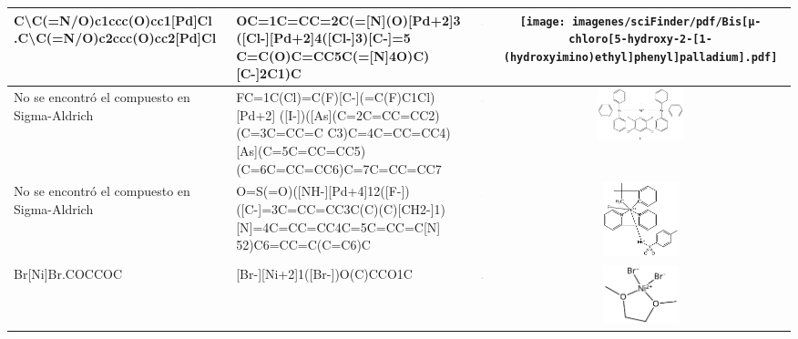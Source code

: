 \begin{landscape}
\begin{longtable}{m{7cm}m{8cm}cc}
 C\textbackslash C(=N/O)c1ccc(O)cc1[Pd]Cl .C\textbackslash C(=N/O)c2ccc(O)cc2[Pd]Cl & 
 OC=1C=CC=2C(=[N](O)[Pd+2]3 ([Cl-][Pd+2]4([Cl-]3)[C-]=5 C=C(O)C=CC5C(=[N]4O)C)[C-]2C1)C & 
 \includegraphics[width=2.2cm]{imagenes/placeholder.png} & 
 \texttt{[image: imagenes/sciFinder/pdf/Bis[µ-chloro[5-hydroxy-2-[1-(hydroxyimino)ethyl]phenyl]palladium].pdf]} \\
\hline


 No se encontró el compuesto en Sigma-Aldrich & 
 FC=1C(Cl)=C(F)[C-](=C(F)C1Cl)[Pd+2] ([I-])([As](C=2C=CC=CC2)(C=3C=CC=C C3)C=4C=CC=CC4)[As](C=5C=CC=CC5) (C=6C=CC=CC6)C=7C=CC=CC7 & 
 \includegraphics[width=2.2cm]{imagenes/placeholder.png} & 
 \includegraphics[width=2.5cm]{imagenes/sciFinder/pdf/(SP-4-3)-(3,5-Dichloro-2,4,6-trifluorophenyl)iodobis(triphenylarsine)palladium.pdf} \\
\hline


 No se encontró el compuesto en Sigma-Aldrich & 
 O=S(=O)([NH-][Pd+4]12([F-])([C-]=3C=CC=CC3C(C)(C)[CH2-]1) [N]=4C=CC=CC4C=5C=CC=C[N] 52)C6=CC=C(C=C6)C & 
 \includegraphics[width=2.2cm]{imagenes/placeholder.png} & 
 \includegraphics[width=2.2cm]{imagenes/sciFinder/pdf/Palladium, (2,2-bipyridine-ÎºN1,ÎºN1)[(2,2-dimethyl-1,2-ethanediyl)-1,2-phenylene]fluoro(4-methylbenzenesulfonamidato-ÎºN)-, (OC-6-35).pdf} \\
\hline


 Br[Ni]Br.COCCOC & 
 [Br-][Ni+2]1([Br-])O(C)CCO1C & 
 \includegraphics[width=2.2cm]{imagenes/sigmaAldrich/Nickel(II) bromide ethylene glycol dimethyl ether complex.png} & 
 \includegraphics[width=2.2cm]{imagenes/sciFinder/pdf/Dibromo(1,2-dimethoxyethane)nickel(II).pdf} \\
\hline



\end{longtable}
\end{landscape}
